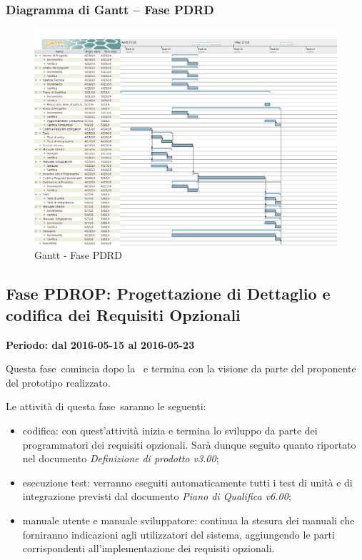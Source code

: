 \documentclass[../PianoProgetto.tex]{subfiles}
\begin{document}
		\subsubsection{Diagramma di Gantt – Fase PDRD}
			\begin{figure}[!h]
				\centering
				\includegraphics[width=\textwidth]{gantt_png/5-requisiti_desiderabili}
				\caption{Gantt - Fase PDRD}
				\label{fig:Gantt - Fase PDRD}
			\end{figure}
			

	\subsection{Fase PDROP: Progettazione di Dettaglio e codifica dei Requisiti Opzionali}
		\textbf{Periodo: dal 2016-05-15 al 2016-05-23}
		
		Questa fase\g\ comincia dopo la \revisionediqualifica\ e termina con la visione da parte del proponente del prototipo realizzato.

		Le attività di questa fase\g\ saranno le seguenti:
		\begin{itemize}
			
			\item codifica: con quest'attività inizia e termina lo sviluppo da parte dei programmatori dei requisiti opzionali. Sarà dunque seguito quanto riportato nel documento \textit{Definizione di prodotto v3.00};

			\item esecuzione test: verranno eseguiti automaticamente tutti i test di unità e di integrazione previsti dal documento \textit{Piano di Qualifica v6.00};

			\item manuale utente e manuale sviluppatore: continua la stesura dei manuali che forniranno indicazioni agli utilizzatori del sistema, aggiungendo le parti corrispondenti all'implementazione dei requisiti opzionali.

		\end{itemize}
		
\end{document}
